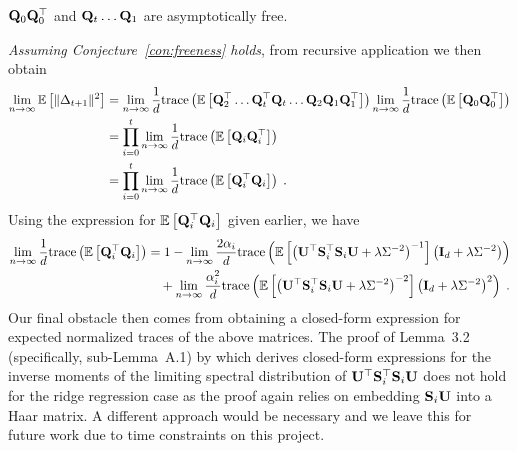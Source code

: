 \begin{conjecture} \label{con:freeness}
 $\mathbf{Q}_0\mathbf{Q}_0^\top$ and $\mathbf{Q}_t\ldots\mathbf{Q}_1$ are asymptotically free.
\end{conjecture}

\textit{Assuming Conjecture~\ref{con:freeness} holds}, from recursive application we then obtain
\begin{align*}
\lim_{n\rightarrow\infty}\mathbb{E}\left[\|\Delta_{t+1}\|^2\right] &= \lim_{n\rightarrow\infty}\frac{1}{d}\mathrm{trace}\left(\mathbb{E}\left[\mathbf{Q}_2^\top\ldots \mathbf{Q}_t^\top\mathbf{Q}_t\ldots\mathbf{Q}_2\mathbf{Q}_1\mathbf{Q}_1^\top\right]\right)\lim_{n\rightarrow\infty}\frac{1}{d}\mathrm{trace}\left(\mathbb{E}\left[\mathbf{Q}_0\mathbf{Q}_0^\top\right]\right) \\
&= \prod_{i=0}^t\lim_{n\rightarrow\infty}\frac{1}{d}\mathrm{trace}\left(\mathbb{E}\left[\mathbf{Q}_i\mathbf{Q}_i^\top\right]\right) \\
&= \prod_{i=0}^t\lim_{n\rightarrow\infty}\frac{1}{d}\mathrm{trace}\left(\mathbb{E}\left[\mathbf{Q}_i^\top\mathbf{Q}_i\right]\right) \;.
\end{align*}
Using the expression for $\mathbb{E}\left[\mathbf{Q}_i^\top\mathbf{Q}_i\right]$ given earlier, we have
\begin{align*}
\lim_{n\rightarrow\infty}\frac{1}{d}\mathrm{trace}\left(\mathbb{E}\left[\mathbf{Q}_i^\top\mathbf{Q}_i\right]\right) &= 1 - \lim_{n\rightarrow\infty}\frac{2\alpha_i}{d}\mathrm{trace}\left(\mathbb{E}\left[\left(\mathbf{U}^\top\mathbf{S}_i^\top\mathbf{S}_i\mathbf{U} + \lambda\Sigma^{-2}\right)^{-1}\right]\left(\mathbf{I}_d + \lambda\Sigma^{-2}\right)\right) \\
&\quad + \lim_{n\rightarrow\infty}\frac{\alpha_i^2}{d}\mathrm{trace}\left(\mathbb{E}\left[\left(\mathbf{U}^\top\mathbf{S}_i^\top\mathbf{S}_i\mathbf{U} + \lambda\Sigma^{-2}\right)^{-2}\right]\left(\mathbf{I}_d + \lambda\Sigma^{-2}\right)^2\right) \;.
\end{align*}
Our final obstacle then comes from obtaining a closed-form expression for expected normalized traces of the above matrices. The proof of Lemma~3.2 (specifically, sub-Lemma~A.1) by \citet{Lacotte:2020} which derives closed-form expressions for the inverse moments of the limiting spectral distribution of $\mathbf{U}^\top\mathbf{S}_i^\top\mathbf{S}_i\mathbf{U}$ does not hold for the ridge regression case as the proof again relies on embedding $\mathbf{S}_i\mathbf{U}$ into a Haar matrix. A different approach would be necessary and we leave this for future work due to time constraints on this project.
\\


